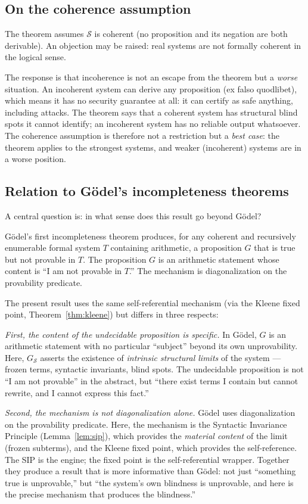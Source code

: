 \documentclass[11pt]{article}
\begin{document}
\subsection{On the coherence assumption}

The theorem assumes $\mathcal{S}$ is coherent (no proposition and its
negation are both derivable). An objection may be raised: real systems
are not formally coherent in the logical sense.

The response is that incoherence is not an escape from the theorem but a
\emph{worse} situation. An incoherent system can derive any proposition
(ex falso quodlibet), which means it has no security guarantee at all:
it can certify as safe anything, including attacks. The theorem says
that a coherent system has structural blind spots it cannot identify;
an incoherent system has no reliable output whatsoever. The coherence
assumption is therefore not a restriction but a \emph{best case}: the
theorem applies to the strongest systems, and weaker (incoherent)
systems are in a worse position.

\subsection{Relation to G\"odel's incompleteness theorems}

A central question is: in what sense does this result go beyond G\"odel?

G\"odel's first incompleteness theorem produces, for any coherent and
recursively enumerable formal system $T$ containing arithmetic, a
proposition $G$ that is true but not provable in $T$. The proposition
$G$ is an arithmetic statement whose content is ``I am not provable in
$T$.'' The mechanism is diagonalization on the provability predicate.

The present result uses the same self-referential mechanism (via the
Kleene fixed point, Theorem~\ref{thm:kleene}) but differs in three
respects:

\emph{First, the content of the undecidable proposition is specific.}
In G\"odel, $G$ is an arithmetic statement with no particular
``subject'' beyond its own unprovability. Here, $G_{\mathcal{S}}$
asserts the existence of \emph{intrinsic structural limits} of the
system --- frozen terms, syntactic invariants, blind spots. The
undecidable proposition is not ``I am not provable'' in the abstract,
but ``there exist terms I contain but cannot rewrite, and I cannot
express this fact.''

\emph{Second, the mechanism is not diagonalization alone.}
G\"odel uses diagonalization on the provability predicate. Here, the
mechanism is the Syntactic Invariance Principle
(Lemma~\ref{lem:sip}), which provides the \emph{material content}
of the limit (frozen subterms), and the Kleene fixed point, which
provides the self-reference. The SIP is the engine; the fixed point is
the self-referential wrapper. Together they produce a result that is
more informative than G\"odel: not just ``something true is
unprovable,'' but ``the system's own blindness is unprovable, and here
is the precise mechanism that produces the blindness.''
\end{document}
